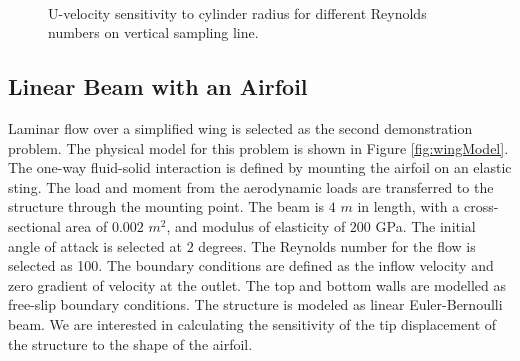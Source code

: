 \documentclass[12pt]{aiaa-pretty}
\begin{document}
\begin{figure}[H]
{	}
	\quad
	\\
	\quad
	\caption{U-velocity sensitivity to cylinder radius for different Reynolds numbers on vertical sampling line.}
	\label{fig:cylinderVelocitySensitivity}
\end{figure}
%

\subsection{Linear Beam with an Airfoil}
Laminar flow over a simplified wing is selected as the second demonstration problem. The physical model for this problem is shown in Figure \ref{fig:wingModel}. The one-way fluid-solid interaction is defined by mounting the airfoil on an elastic sting. The load and moment from the aerodynamic loads are transferred to the structure through the mounting point. The beam is $4$ $m$ in length, with a cross-sectional area of $0.002$ $m^2$, and modulus of elasticity of $200$ GPa. The initial angle of attack is selected at $2$ degrees. The Reynolds number for the flow is selected as 100. The boundary conditions are defined as the inflow velocity and zero gradient of velocity at the outlet. The top and bottom walls are modelled as free-slip boundary conditions. The structure is modeled as linear Euler-Bernoulli beam. We are interested in calculating the sensitivity of the tip displacement of the structure to the shape of the airfoil.
\end{document}
